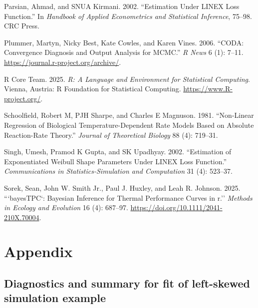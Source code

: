 \documentclass[
]{article}
\newlength{\cslhangindent}
\newenvironment{CSLReferences}[2] %
 {\begin{list}{}{%
  \setlength{\itemindent}{0pt}
  \setlength{\leftmargin}{0pt}
  \setlength{\parsep}{0pt}
  \ifodd #1
   \setlength{\leftmargin}{\cslhangindent}
   \setlength{\itemindent}{-1\cslhangindent}
  \fi
  \setlength{\itemsep}{#2\baselineskip}}}
 {\end{list}}
\begin{document}
\begin{CSLReferences}{1}{0}
Parsian, Ahmad, and SNUA Kirmani. 2002. {``Estimation Under LINEX Loss
Function.''} In \emph{Handbook of Applied Econometrics and Statistical
Inference}, 75--98. CRC Press.

Plummer, Martyn, Nicky Best, Kate Cowles, and Karen Vines. 2006.
{``CODA: Convergence Diagnosis and Output Analysis for MCMC.''} \emph{R
News} 6 (1): 7--11. \url{https://journal.r-project.org/archive/}.

R Core Team. 2025. \emph{R: A Language and Environment for Statistical
Computing}. Vienna, Austria: R Foundation for Statistical Computing.
\url{https://www.R-project.org/}.

Schoolfield, Robert M, PJH Sharpe, and Charles E Magnuson. 1981.
{``Non-Linear Regression of Biological Temperature-Dependent Rate Models
Based on Absolute Reaction-Rate Theory.''} \emph{Journal of Theoretical
Biology} 88 (4): 719--31.

Singh, Umesh, Pramod K Gupta, and SK Upadhyay. 2002. {``Estimation of
Exponentiated Weibull Shape Parameters Under LINEX Loss Function.''}
\emph{Communications in Statistics-Simulation and Computation} 31 (4):
523--37.

Sorek, Sean, John W. Smith Jr., Paul J. Huxley, and Leah R. Johnson.
2025. {```bayesTPC`: Bayesian Inference for Thermal Performance Curves
in r.''} \emph{Methods in Ecology and Evolution} 16 (4): 687--97.
\url{https://doi.org/10.1111/2041-210X.70004}.

\end{CSLReferences}

\clearpage

\setcounter{section}{0}
\renewcommand{\thesection}{\Alph{section}}

\setcounter{table}{0}
\renewcommand{\thetable}{A\arabic{table}}

\setcounter{figure}{0}
\renewcommand{\thefigure}{A\arabic{figure}}

\section{Appendix}\label{sec-app}

\subsection{Diagnostics and summary for fit of left-skewed simulation
example}\label{sec-diagL}
\end{document}
